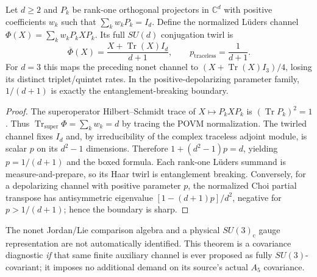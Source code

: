 \documentclass[12pt,a4paper]{article}
\begin{document}
\begin{theorem}
\label{p4b:thm:cc18-rankone-haar-twirl}
Let $d\ge2$ and $P_k$ be rank-one orthogonal projectors in
$\mathbb C^d$ with positive coefficients $w_k$ such that
$\sum_kw_kP_k=I_d$.  Define the normalized L\"uders channel
$\Phi(X)=\sum_kw_kP_kXP_k$.  Its full $SU(d)$ conjugation twirl is
\[
\boxed{\overline\Phi(X)=\frac{X+\operatorname{Tr}(X)I_d}{d+1},
\qquad p_{\mathrm{traceless}}=\frac1{d+1}.}
\]
For $d=3$ this maps the preceding nonet channel to
$(X+\operatorname{Tr}(X)I_3)/4$, losing its distinct triplet/quintet
rates.  In the positive-depolarizing parameter family, $1/(d+1)$
is exactly the entanglement-breaking boundary.
\end{theorem}
\begin{proof}
The superoperator Hilbert--Schmidt trace of
$X\mapsto P_kXP_k$ is $(\operatorname{Tr}P_k)^2=1$.
Thus $\operatorname{Tr}_{\mathrm{super}}\Phi=\sum_kw_k=d$
by tracing the POVM normalization.  The twirled channel fixes
$I_d$ and, by irreducibility of the complex traceless adjoint
module, is scalar $p$ on its $d^2-1$ dimensions.
Therefore $1+(d^2-1)p=d$, yielding $p=1/(d+1)$ and the boxed
formula.  Each rank-one L\"uders summand is measure-and-prepare,
so its Haar twirl is entanglement breaking.  Conversely, for a
depolarizing channel with positive parameter $p$, the normalized
Choi partial transpose has antisymmetric eigenvalue
$[1-(d+1)p]/d^2$, negative for $p>1/(d+1)$; hence the boundary
is sharp.
\end{proof}
\begin{remark}
The nonet Jordan/Lie comparison algebra and a physical
$SU(3)_{\mathrm c}$ gauge representation are not automatically
identified.  This theorem is a covariance diagnostic \emph{if}
that same finite auxiliary channel is ever proposed as fully
$SU(3)$-covariant; it imposes no additional demand on its source's
actual $A_5$ covariance.
\end{remark}



\end{document}
